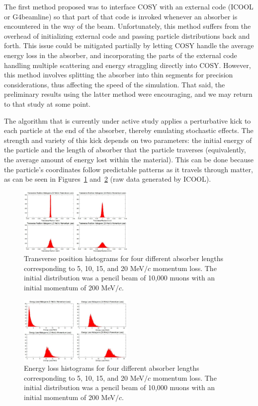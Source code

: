 \documentclass{jacow}
\begin{document}
The first method proposed was to interface COSY with an external code (ICOOL or G4beamline) so that part of that code is invoked whenever an absorber is encountered in the way of the beam. Unfortunately, this method suffers from the overhead of initializing external code and passing particle distributions back and forth. This issue could be mitigated partially by letting COSY handle the average energy loss in the absorber, and incorporating the parts of the external code handling multiple scattering and energy straggling directly into COSY. However, this method involves splitting the absorber into thin segments for precision considerations, thus affecting the speed of the simulation. That said, the preliminary results using the latter method were encouraging, and we may return to that study at some point.

The algorithm that is currently under active study applies a perturbative kick to each particle at the end of the absorber, thereby emulating stochastic effects. The strength and variety of this kick depends on two parameters: the initial energy of the particle and the length of absorber that the particle traverses (equivalently, the average amount of energy lost within the material). This can be done because the particle's coordinates follow predictable patterns as it travels through matter, as can be seen in Figures~\ref{fig:scattering} and~\ref{fig:straggling} (raw data generated by ICOOL).

\begin{figure}[htb]
\centering
\includegraphics[width=0.49\textwidth]{figures/scattering.jpg}
\caption{Transverse position histograms for four different absorber lengths corresponding to 5, 10, 15, and 20 MeV$/c$ momentum loss. The initial distribution was a pencil beam of 10,000 muons with an initial momentum of 200 MeV$/c$.}
\label{fig:scattering}
\end{figure}

\begin{figure}[htb]
\centering
\includegraphics[width=0.49\textwidth]{figures/straggling.jpg}
\caption{Energy loss histograms for four different absorber lengths corresponding to 5, 10, 15, and 20 MeV$/c$ momentum loss. The initial distribution was a pencil beam of 10,000 muons with an initial momentum of 200 MeV$/c$.}
\label{fig:straggling}
\end{figure}
\end{document}
